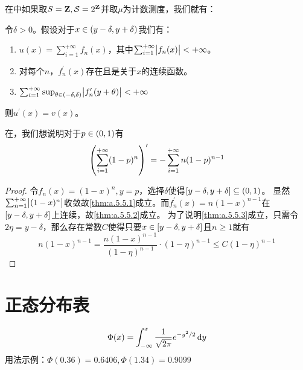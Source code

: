 \documentclass[main.tex]{subfiles}
\begin{document}
在中如果取\(S=\mathbf{Z}, \mathcal{S}=2^{\mathbf{Z}}\)并取\(\mu\)为计数测度，我们就有：
\begin{theorem}
	令\(\delta > 0\)。假设对于\(x \in \intoo{y-\delta, y+\delta}\)我们有：
	\begin{enumerate}
		\item \label{thm:a.5.5.1} \(u(x) = \sum_{i=1}^{+\infty}f_n(x)\)，其中\(\sum_{i=1}^{+\infty} \envert{f_n(x)} < +\infty\)。
		\item \label{thm:a.5.5.2} 对每个\(n\)，\(f_n^\prime(x)\)存在且是关于\(x\)的连续函数。
		\item \label{thm:a.5.5.3}  \(\sum_{i=1}^{+\infty}\sup_{\theta\in\intoo{-\delta, \delta}} \envert{f_n^\prime(y+\theta)} < +\infty\)
	\end{enumerate}
	则\(u^\prime(x)=v(x)\)。
\end{theorem}
\begin{example}\label{exp:a.5.6}
	在，我们想说明对于\(p\in\intoo{0,1}\)有
	\[\del{\sum_{i=1}^{+\infty}(1-p)^n}^\prime = -\sum_{i=1}^{+\infty}n(1-p)^{n-1}\]
\end{example}
\begin{proof}
	令\(f_n(x) = (1-x)^n, y=p\)，选择\(\delta\)使得\(\intcc{y-\delta, y+\delta} \subseteq \intoo{0,1}\)。
	显然\(\sum_{n=1}^{+\infty} \envert{(1-x)^n}\)收敛故\ref{thm:a.5.5.1}成立。而\(f_n^\prime(x) = n(1-x)^{n-1}\)在\(\intcc{y-\delta, y+\delta}\)上连续，故\ref{thm:a.5.5.2}成立。
	为了说明\ref{thm:a.5.5.3}成立，只需令\(2\eta = y-\delta\)，那么存在常数\(C\)使得只要\(x\in\intcc{y-\delta, y+\delta}\)且\(n\geq 1\)就有
	\[n(1-x)^{n-1} = \frac{n(1-x)^{n-1}}{(1-\eta)^{n-1}}\cdot (1-\eta)^{n-1}\leq C(1-\eta)^{n-1}\]
\end{proof}
\section*{正态分布表}
\[\Phi(x) = \int_{-\infty}^{x}\frac{1}{\sqrt{2\pi}}e^{-y^2/2} \dif y\]
用法示例：\(\Phi(0.36)=0.6406, \Phi(1.34)=0.9099\)
%
\end{document}
